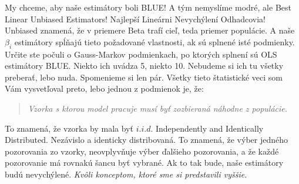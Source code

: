 My chceme, aby naše estimátory boli BLUE! A tým nemyslíme modré, ale
Best Linear Unbiased Estimators! Najlepší Lineárni Nevychýlení
Odhadcovia! Unbiased znamená, že v priemere Beta trafí cieľ, teda
priemer populácie. A naše \(\beta_i\) estimátory spĺňajú tieto
požadované vlastnosti, ak sú splnené isté podmienky. Určite ste počuli o
Gauss-Markov podmienkach, po ktorých splnení sú OLS estimátory BLUE.
Niekto ich uvádza 5, niekto 10. Nebudeme si ich tu všetky preberať, lebo
nuda. Spomenieme si len pár. Všetky tieto štatistické veci som Vám
vysvetľoval preto, lebo jednou z podmienok je, že:

\begin{center}

\begin{quote}
\emph{Vzorka s ktorou model pracuje musí byť zozbieraná náhodne z
populácie.}
\end{quote}

\end{center}

To znamená, že vzorka by mala byť \(i.i.d\). Independently and
Identically Distributed. Nezávislo a identicky distribovaná. To znamená,
že výber jedného pozorovania zo vzorky, neovplyvňuje výber ďalšieho
pozorovania, a že každé pozorovanie má rovnakú šancu byť vybrané. Ak to
tak bude, naše estimátory budú nevychýlené. \emph{Kvôli konceptom, ktoré
sme si predstavili vyššie.}

\begin{Shaded}
\begin{Highlighting}[]

\StringTok{ }\NormalTok{(} \NormalTok{, } \NormalTok{, } \NormalTok{)}


\NormalTok{(}  \NormalTok{, } \NormalTok{), } \NormalTok{,}
      \NormalTok{, } \NormalTok{, } \NormalTok{)}

\NormalTok{(} \NormalTok{)}
\end{Highlighting}
\end{Shaded}

